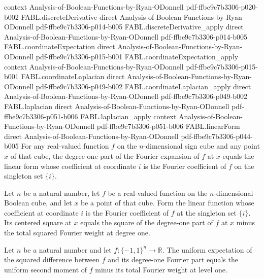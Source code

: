 \begin{theorem}
  {context}
  {Analysis-of-Boolean-Functions-by-Ryan-ODonnell}
  {pdf-ffbe9c7b3306-p020-b002}
\proofstep
  {FABL.discreteDerivative}
  {direct}
  {Analysis-of-Boolean-Functions-by-Ryan-ODonnell}
  {pdf-ffbe9c7b3306-p014-b005}
\proofstep
  {FABL.discreteDerivative_apply}
  {direct}
  {Analysis-of-Boolean-Functions-by-Ryan-ODonnell}
  {pdf-ffbe9c7b3306-p014-b005}
\proofstep
  {FABL.coordinateExpectation}
  {direct}
  {Analysis-of-Boolean-Functions-by-Ryan-ODonnell}
  {pdf-ffbe9c7b3306-p015-b001}
\proofstep
  {FABL.coordinateExpectation_apply}
  {context}
  {Analysis-of-Boolean-Functions-by-Ryan-ODonnell}
  {pdf-ffbe9c7b3306-p015-b001}
\proofstep
  {FABL.coordinateLaplacian}
  {direct}
  {Analysis-of-Boolean-Functions-by-Ryan-ODonnell}
  {pdf-ffbe9c7b3306-p049-b002}
\proofstep
  {FABL.coordinateLaplacian_apply}
  {direct}
  {Analysis-of-Boolean-Functions-by-Ryan-ODonnell}
  {pdf-ffbe9c7b3306-p049-b002}
\proofstep
  {FABL.laplacian}
  {direct}
  {Analysis-of-Boolean-Functions-by-Ryan-ODonnell}
  {pdf-ffbe9c7b3306-p051-b006}
\proofstep
  {FABL.laplacian_apply}
  {context}
  {Analysis-of-Boolean-Functions-by-Ryan-ODonnell}
  {pdf-ffbe9c7b3306-p051-b006}
\proofstep
  {FABL.linearForm}
  {direct}
  {Analysis-of-Boolean-Functions-by-Ryan-ODonnell}
  {pdf-ffbe9c7b3306-p044-b005}
For any real-valued function $f$ on the $n$-dimensional sign cube and any point $x$ of
that cube, the degree-one part of the Fourier expansion of $f$ at $x$ equals the linear
form whose coefficient at coordinate $i$ is the Fourier coefficient of $f$ on the
singleton set $\{i\}$.
\end{theorem}

\begin{theorem}
\label{FABL.centeredLinearSquare_singletonCoeffs}
\leanok
{}
Let $n$ be a natural number, let $f$ be a real-valued function on the $n$-dimensional
Boolean cube, and let $x$ be a point of that cube. Form the linear function whose
coefficient at coordinate $i$ is the Fourier coefficient of $f$ at the singleton set
$\{i\}$. Its centered square at $x$ equals the square of the degree-one part of $f$ at
$x$ minus the total squared Fourier weight at degree one.
\end{theorem}

\begin{theorem}
\label{FABL.expect_sub_degreePart_one_sq}
\leanok
{}
Let $n$ be a natural number and let $f\colon\{-1,1\}^n\to\mathbb{R}$. The uniform
expectation of the squared difference between $f$ and its degree-one Fourier part equals
the uniform second moment of $f$ minus its total Fourier weight at level one.
\end{theorem}

